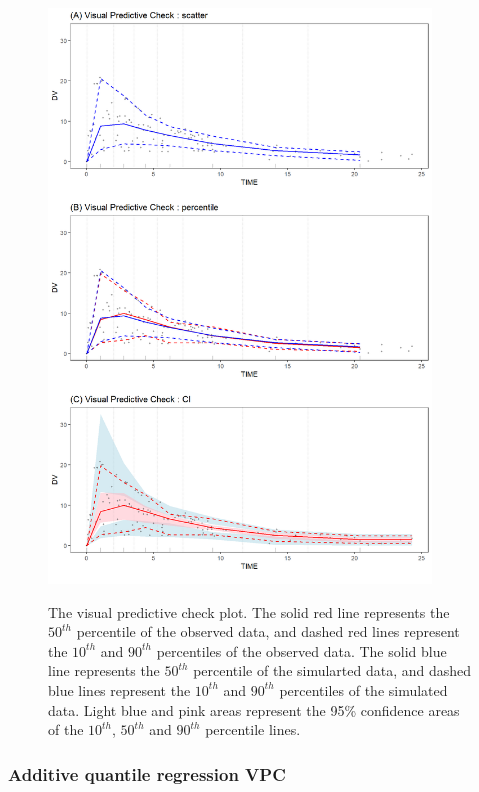 \begin{figure}
\caption{The visual predictive check plot. The solid red line represents the $50^{th}$ percentile of the observed data, and dashed red lines represent the $10^{th}$ and $90^{th}$ percentiles of the observed data. The solid blue line represents the $50^{th}$ percentile of the simularted data, and dashed blue lines represent the $10^{th}$ and $90^{th}$ percentiles of the simulated data.
Light blue and pink areas represent the 95\% confidence areas of the $10^{th}$, $50^{th}$ and $90^{th}$ percentile lines.}
\centering
\includegraphics[width=4in,height=6in]{plotPNG/Fig0-1.png}
\label{Fig0}
\end{figure}


\hypertarget{aqrVPC}{%
\subsubsection{Additive quantile regression VPC}\label{aqrVPC}}

